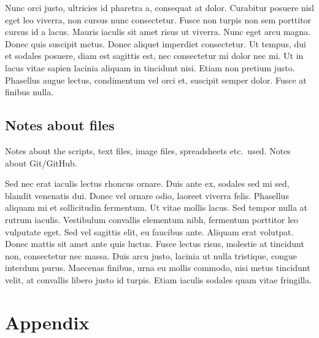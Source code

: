 \documentclass[parskip=full]{scrreprt}
\begin{document}
Nunc orci justo, ultricies id pharetra a, consequat at dolor. Curabitur posuere nisl eget leo viverra, non cursus nunc consectetur. Fusce non turpis non sem porttitor cursus id a lacus. Mauris iaculis sit amet risus ut viverra. Nunc eget arcu magna. Donec quis suscipit metus. Donec aliquet imperdiet consectetur. Ut tempus, dui et sodales posuere, diam est sagittis est, nec consectetur mi dolor nec mi. Ut in lacus vitae sapien lacinia aliquam in tincidunt nisi. Etiam non pretium justo. Phasellus augue lectus, condimentum vel orci et, suscipit semper dolor. Fusce at finibus nulla.

\section{Notes about files}
\label{sec:files}

Notes about the scripts, text files, image files, spreadsheets etc.\ used. Notes about Git/GitHub.

Sed nec erat iaculis lectus rhoncus ornare. Duis ante ex, sodales sed mi sed, blandit venenatis dui. Donec vel ornare odio, laoreet viverra felis. Phasellus aliquam mi et sollicitudin fermentum. Ut vitae mollis lacus. Sed tempor nulla at rutrum iaculis. Vestibulum convallis elementum nibh, fermentum porttitor leo vulputate eget. Sed vel sagittis elit, eu faucibus ante. Aliquam erat volutpat. Donec mattis sit amet ante quis luctus. Fusce lectus risus, molestie at tincidunt non, consectetur nec massa. Duis arcu justo, lacinia ut nulla tristique, congue interdum purus. Maecenas finibus, urna eu mollis commodo, nisi metus tincidunt velit, at convallis libero justo id turpis. Etiam iaculis sodales quam vitae fringilla. 

\chapter*{Appendix}
\label{ch:appendix}



\nocite{*}
\printbibliography
\end{document}
